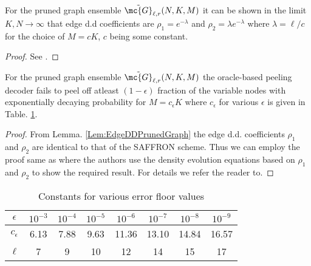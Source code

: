 \documentclass[conference,twocolumn]{IEEEtran}
\def\ceps{c_{\epsilon}}
\def\proofgap{-3ex}
\begin{document}
{\begin{lemma}
\label{Lem:EdgeDDPrunedGraph}
For the pruned graph ensemble $\tilde{\mc{G}}_{\ell,r}(N,K,M)$ it can be shown in the limit $K,N\rightarrow\infty$ that edge d.d coefficients are $\rho_{1}=e^{-\lambda}$ and $\rho_{2}=\lambda e^{-\lambda}$ where $\lambda=\ell/c$ for the choice of $M=cK$, $c$ being some constant.
\end{lemma}
\vspace{\proofgap}
\begin{proof}
See .
\end{proof}

\begin{lemma}
For the pruned graph ensemble $\tilde{\mc{G}}_{\ell,r}(N, K,M)$ the oracle-based peeling decoder fails to peel off atleast $(1-\epsilon)$ fraction of the variable nodes with exponentially decaying probability for $M=\ceps K$ where $\ceps$ for various $\epsilon$ is given in Table. \ref{Table:constantsDE}.
\label{Lem:PeelingRegularAnalysis}
\vspace{\proofgap}
\end{lemma}
\begin{proof}
From Lemma. \ref{Lem:EdgeDDPrunedGraph} the edge d.d. coefficients $\rho_1$ and $\rho_2$ are identical to that of the SAFFRON scheme. Thus we can employ the proof same as \cite[Thm.~4.1]{lee2015saffron} where the authors use the density evolution equations based on $\rho_1$ and $\rho_2$ to show the required result. For details we refer the reader to.
\end{proof}

\begin{table}[h!]
\centering
\begin{tabular}{| c | c | c | c | c | c | c | c | }
\hline
$\epsilon$ & $10^{-3}$ & $10^{-4}$ & $10^{-5}$ & $10^{-6}$ &$ 10^{-7}$ & $10^{-8}$ & $10^{-9}$ \\ \hline
$\ceps$ & 6.13 & 7.88 & 9.63 & 11.36 & 13.10 & 14.84 & 16.57 \\ \hline
 $\ell$ & 7 & 9 & 10 & 12 & 14 & 15 & 17 \\ \hline
\end{tabular}
\vspace{1ex}
\caption{Constants for various error floor values}
\label{Table:constantsDE}
\end{table}

}
\end{document}
